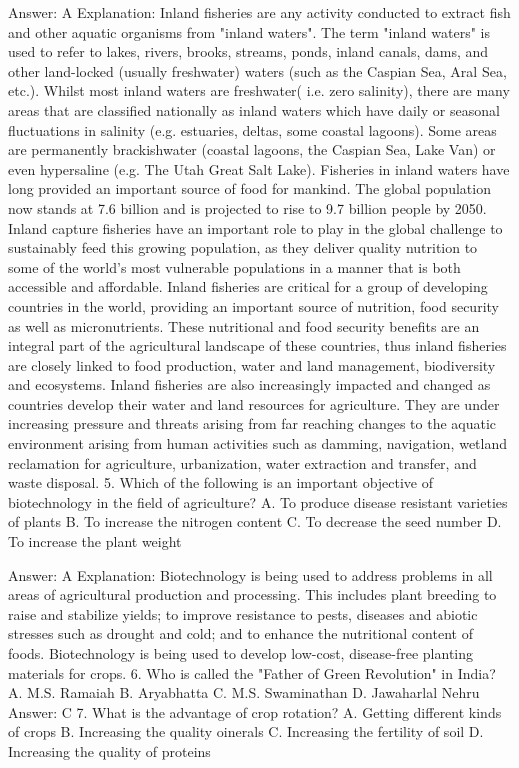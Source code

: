 Answer: A
Explanation: Inland fisheries are any activity conducted to extract fish and other aquatic organisms from "inland waters". The term "inland waters" is used to refer to lakes, rivers, brooks, streams, ponds, inland canals, dams, and other land-locked (usually freshwater) waters (such as the Caspian Sea, Aral Sea, etc.). Whilst most inland waters are freshwater( i.e. zero salinity), there are many areas that are classified nationally as inland waters which have daily or seasonal fluctuations in salinity (e.g. estuaries, deltas, some coastal lagoons). Some areas are permanently brackishwater (coastal lagoons, the Caspian Sea, Lake Van) or even hypersaline (e.g. The Utah Great Salt Lake). Fisheries in inland waters have long provided an important source of food for mankind. The global population now stands at 7.6 billion and is projected to rise to 9.7 billion people by 2050. Inland capture fisheries have an important role to play in the global challenge to sustainably feed this growing population, as they deliver quality nutrition to some of the world’s most vulnerable populations in a manner that is both accessible and affordable. Inland fisheries are critical for a group of developing countries in the world, providing an important source of nutrition, food security as well as micronutrients. These nutritional and food security benefits are an integral part of the agricultural landscape of these countries, thus inland fisheries are closely linked to food production, water and land management, biodiversity and ecosystems. Inland fisheries are also increasingly impacted and changed as countries develop their water and land resources for agriculture. They are under increasing pressure and threats arising from far reaching changes to the aquatic environment arising from human activities such as damming, navigation, wetland reclamation for agriculture, urbanization, water extraction and transfer, and waste disposal. 5. Which of the following is an important objective of biotechnology in the field of agriculture? A. To produce disease resistant varieties of plants B. To increase the nitrogen content C. To decrease the seed number D. To increase the plant weight 

Answer: A
Explanation: Biotechnology is being used to address problems in all areas of agricultural production and processing. This includes plant breeding to raise and stabilize yields; to improve resistance to pests, diseases and abiotic stresses such as drought and cold; and to enhance the nutritional content of foods. Biotechnology is being used to develop low-cost, disease-free planting materials for crops. 6. Who is called the "Father of Green Revolution" in India? A. M.S. Ramaiah B. Aryabhatta C. M.S. Swaminathan D. Jawaharlal Nehru 
Answer: C 7. What is the advantage of crop rotation? A. Getting different kinds of crops B. Increasing the 
quality oinerals C. Increasing the fertility of soil D. Increasing the quality of proteins 


